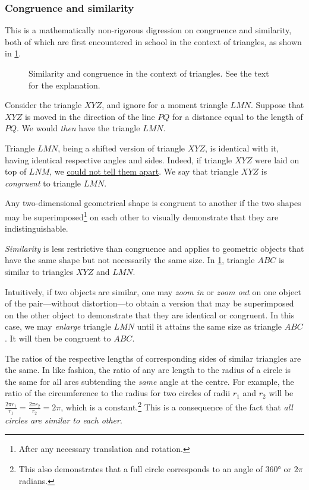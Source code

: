 \documentclass[
  a4paper,
]{article}
\begin{document}
\hypertarget{congruence-and-similarity}{%
\subsubsection{Congruence and
similarity}\label{congruence-and-similarity}}

This is a mathematically non-rigorous digression on congruence and
similarity, both of which are first encountered in school in the context
of triangles, as shown in \cref{fig:similar}.

\begin{figure}
\hypertarget{fig:similar}{%
\centering

\caption{Similarity and congruence in the context of triangles. See the
text for the explanation.}\label{fig:similar}
}
\end{figure}

Consider the triangle \(XYZ\), and ignore for a moment triangle \(LMN\).
Suppose that \(XYZ\) is moved in the direction of the line \(PQ\) for a
distance equal to the length of \(PQ\). We would \emph{then} have the
triangle \(LMN\).

Triangle \(LMN\), being a shifted version of triangle \(XYZ\), is
identical with it, having identical respective angles and sides. Indeed,
if triangle \(XYZ\) were laid on top of \(LNM\), we
\href{https://www.merriam-webster.com/dictionary/tell\%20apart}{could
not tell them apart}. We say that triangle \(XYZ\) is \emph{congruent}
to triangle \(LMN\).

Any two-dimensional geometrical shape is congruent to another if the two
shapes may be superimposed\footnote{After any necessary translation and
  rotation.} on each other to visually demonstrate that they are
indistinguishable.

\emph{Similarity} is less restrictive than congruence and applies to
geometric objects that have the same shape but not necessarily the same
size. In \cref{fig:similar}, triangle \(ABC\) is similar to triangles
\(XYZ\) and \(LMN\).

Intuitively, if two objects are similar, one may \emph{zoom in} or
\emph{zoom out} on one object of the pair---without distortion---to
obtain a version that may be superimposed on the other object to
demonstrate that they are identical or congruent. In this case, we may
\emph{enlarge} triangle \(LMN\) until it attains the same size as
triangle \(ABC\). It will then be congruent to \(ABC\).

The ratios of the respective lengths of corresponding sides of similar
triangles are the same. In like fashion, the ratio of any arc length to
the radius of a circle is the same for all arcs subtending the
\emph{same} angle at the centre. For example, the ratio of the
circumference to the radius for two circles of radii \(r_1\) and \(r_2\)
will be \(\frac{2\pi r_1}{r_1} =\frac{2\pi r_2}{r_2} = 2\pi\), which is
a constant.\footnote{This also demonstrates that a full circle
  corresponds to an angle of 360° or \(2\pi\) radians.} This is a
consequence of the fact that \emph{all circles are similar to each
other}.
\end{document}
